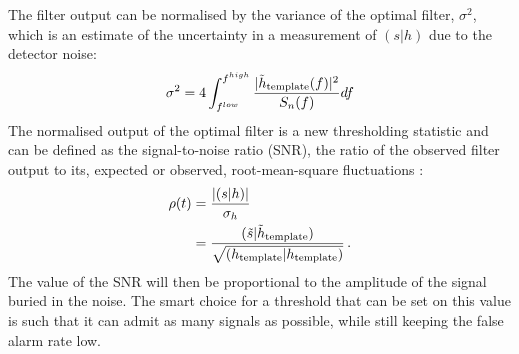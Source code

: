 \documentclass[binding=0.6cm, LaM]{sapthesis}
\begin{document}
	The filter output can be normalised by the variance of the optimal filter, $\sigma^2$,
	which is an estimate of the uncertainty in a measurement of $(s|h)$ due to the detector noise:
        \begin{equation}
          \sigma^2 =4 \int^{f^{high}}_{f^{low}} {{|\tilde h_{\rm template}(f)|^2} \over {S_n(f)}}df
        \end{equation}
 	The normalised output of the optimal filter is a new thresholding statistic and can be defined as
	the signal-to-noise ratio (SNR), the ratio of the observed filter output to its,
        expected or observed, root-mean-square fluctuations \cite{24}:
        \begin{align}
          \rho(t) &= {{| (s|h) |} \over {\sigma_{h}}} \\
          &= {{(\tilde s|\tilde h_{\rm template})} \over {\sqrt{(h_{\rm template}|h_{\rm template})}}}\,.
        \end{align}
        The value of the SNR will then be proportional to the amplitude of the signal buried in the noise.
	The smart choice for a threshold that can be set on this value is such that
	it can admit as many signals as possible, while still keeping the false alarm rate low. 
\end{document}
